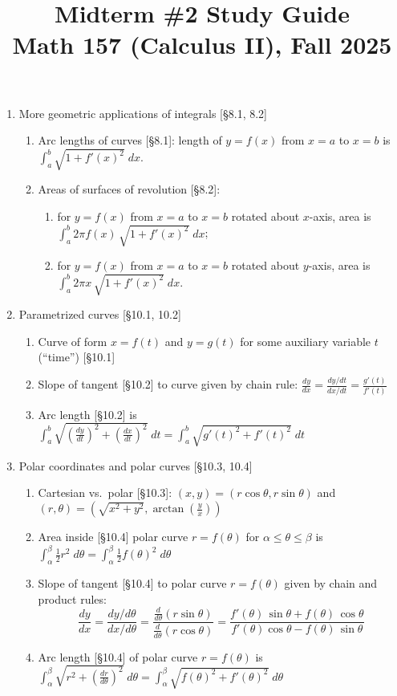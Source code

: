 \documentclass[11pt]{article}
\title{Midterm \#2 Study Guide \\ Math 157 (Calculus II), Fall 2025}
\date{}
\begin{document}
\maketitle

\thispagestyle{empty}

\vspace{-2cm}

\begin{enumerate}
\item More geometric applications of integrals [\S8.1, 8.2]
\begin{enumerate}
\item Arc lengths of curves [\S8.1]: length of $y=f(x)$ from $x=a$ to $x=b$ is $\int_{a}^{b} \sqrt{1+f'(x)^2} \; dx$.
\item Areas of surfaces of revolution [\S8.2]: 
\begin{enumerate}
\item for $y=f(x)$ from $x=a$ to $x=b$ rotated about $x$-axis, area is $\int_{a}^{b} 2\pi f(x) \, \sqrt{1+f'(x)^2} \; dx$;
\item for $y=f(x)$ from $x=a$ to $x=b$ rotated about $y$-axis, area is $\int_{a}^{b} 2\pi x \, \sqrt{1+f'(x)^2} \; dx$.
\end{enumerate}
\end{enumerate}

\item Parametrized curves [\S10.1, 10.2]
\begin{enumerate}
\item Curve of form $x=f(t)$ and $y=g(t)$ for some auxiliary variable $t$ (``time'') [\S10.1]
\item Slope of tangent [\S10.2] to curve given by chain rule: $\frac{dy}{dx} = \frac{dy/dt}{dx/dt} = \frac{g'(t)}{f'(t)}$ 
\item Arc length [\S10.2] is $\int_{a}^{b} \sqrt{(\frac{dy}{dt})^2 + (\frac{dx}{dt})^2} \; dt = \int_{a}^{b} \sqrt{g'(t)^2 + f'(t)^2} \; dt$
\end{enumerate}

\item Polar coordinates and polar curves [\S10.3, 10.4]
\begin{enumerate}
\item Cartesian vs.~polar [\S10.3]: $(x,y) = (r\cos \theta, r \sin \theta)$ and $(r,\theta) = (\sqrt{x^2+y^2}, \arctan (\frac{y}{x}))$
\item Area inside [\S10.4] polar curve $r=f(\theta)$ for $\alpha \leq \theta \leq \beta$ is $\int_{\alpha}^{\beta} \frac{1}{2} r^2 \; d\theta=\int_{\alpha}^{\beta} \frac{1}{2} f(\theta)^2 \; d\theta$ 
\item Slope of tangent [\S10.4] to polar curve $r=f(\theta)$ given by chain and product rules: 
{\small \[\frac{dy}{dx} = \frac{dy/d\theta}{dx/d\theta} = \frac{\frac{d}{d\theta}(r \sin\theta)}{\frac{d}{d\theta}(r \cos\theta)} = \frac{f'(\theta)\, \sin \theta  + f(\theta) \, \cos \theta}{f'(\theta)\cos\theta-f(\theta)\, \sin\theta }\]}
\item Arc length [\S10.4] of polar curve $r=f(\theta)$ is $\int_{\alpha}^{\beta} \sqrt{r^2 + (\frac{dr}{d\theta})^2} \; d\theta = \int_{\alpha}^{\beta} \sqrt{f(\theta)^2 + f'(\theta)^2} \; d\theta$ 
\end{enumerate}

\end{enumerate}
\end{document}
